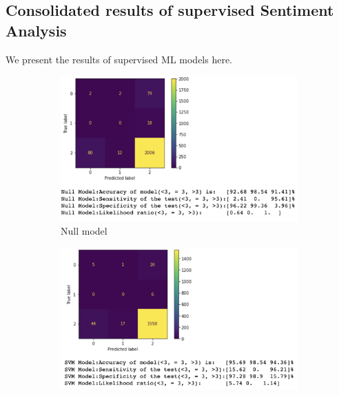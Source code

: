 \documentclass[11pt, letterpaper]{article}
\begin{document}

\subsection{Consolidated results of supervised Sentiment Analysis}
We present the results of supervised ML models here. 
\begin{figure}[H]%
     \centering
     \begin{subfigure}[b]{0.3\textwidth}
         \centering
         \includegraphics[width=\textwidth]{null_model_metrics.png}
         \caption{Null model}
         \label{fig:Null Model}
     \end{subfigure}
     \hfill
     \begin{subfigure}[b]{0.3\textwidth}
         \centering
         \includegraphics[width=\textwidth]{svm_model_metrics.png}

\end{subfigure}
\end{figure}
\end{document}

